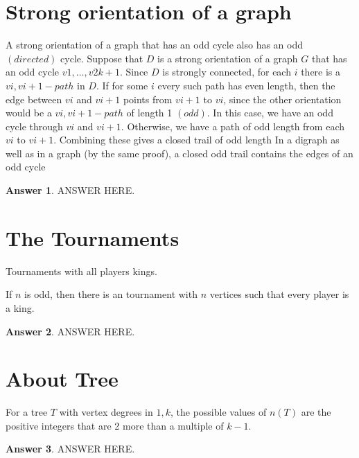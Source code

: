\documentclass[a4paper]{article}
\renewcommand{\(}{\left(}
\renewcommand{\)}{\right)}
\theoremstyle{plain}
\theoremstyle{plain}
\theoremstyle{definition}
\newtheorem*{answer}{Answer}
\begin{document}
\section{Strong orientation of a graph}
A strong orientation of a graph that has an odd cycle also has an odd $(directed)$ cycle. Suppose that $D$ is a strong orientation of a graph $G$ that has an odd cycle $v1, \dots , v2k+1$. Since $D$ is strongly connected, for each $i$ there is a $vi, vi+1-path$ in $D$. If for some $i$ every such path has even length, then the edge between $vi$ and $vi+1$ points from $vi+1$ to $vi$, since the other orientation would be a $vi, vi+1-path$ of length 1 $(odd)$. In this case, we have an odd cycle through $vi$ and $vi+1$. Otherwise, we have a path of odd length from each $vi$ to $vi+1$. Combining these gives a closed trail of odd length In a digraph as well as in a graph (by the same proof), a closed odd trail contains the edges of an odd cycle
\begin{shaded}
\begin{answer}
ANSWER HERE.
\end{answer}
\end{shaded}

\section{The Tournaments}
Tournaments with all players kings.

 If $n$ is odd, then there is an tournament with $n$ vertices such that every player is a king.
\begin{shaded}
\begin{answer}
ANSWER HERE.
\end{answer}
\end{shaded}


\section{About Tree}
For a tree $T$ with vertex degrees in ${1, k}$, the possible values of $n(T)$ are the positive integers that are 2 more than a multiple of $k − 1$.
\begin{shaded}
\begin{answer}
ANSWER HERE.
\end{answer}
\end{shaded}
\end{document}
